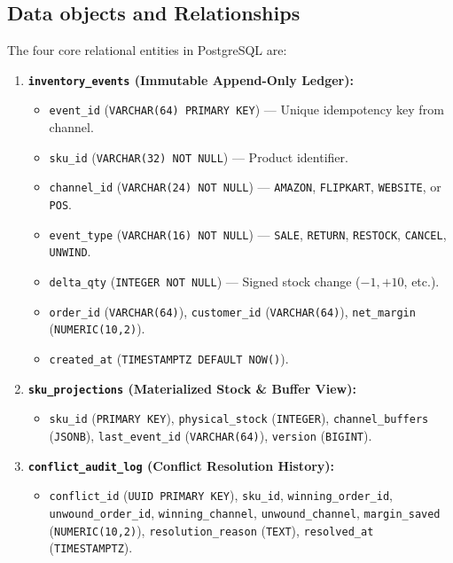 \documentclass[oneside,a4paper,12pt]{report}
\begin{document}
\subsection{Data objects and Relationships}
The four core relational entities in PostgreSQL are:
\begin{enumerate}
  \item \textbf{\texttt{inventory\_events} (Immutable Append-Only Ledger):}
  \begin{itemize}
    \item \texttt{event\_id} (\texttt{VARCHAR(64) PRIMARY KEY}) — Unique idempotency key from channel.
    \item \texttt{sku\_id} (\texttt{VARCHAR(32) NOT NULL}) — Product identifier.
    \item \texttt{channel\_id} (\texttt{VARCHAR(24) NOT NULL}) — \texttt{AMAZON}, \texttt{FLIPKART}, \texttt{WEBSITE}, or \texttt{POS}.
    \item \texttt{event\_type} (\texttt{VARCHAR(16) NOT NULL}) — \texttt{SALE}, \texttt{RETURN}, \texttt{RESTOCK}, \texttt{CANCEL}, \texttt{UNWIND}.
    \item \texttt{delta\_qty} (\texttt{INTEGER NOT NULL}) — Signed stock change ($-1, +10$, etc.).
    \item \texttt{order\_id} (\texttt{VARCHAR(64)}), \texttt{customer\_id} (\texttt{VARCHAR(64)}), \texttt{net\_margin} (\texttt{NUMERIC(10,2)}).
    \item \texttt{created\_at} (\texttt{TIMESTAMPTZ DEFAULT NOW()}).
  \end{itemize}
  \item \textbf{\texttt{sku\_projections} (Materialized Stock \& Buffer View):}
  \begin{itemize}
    \item \texttt{sku\_id} (\texttt{PRIMARY KEY}), \texttt{physical\_stock} (\texttt{INTEGER}), \texttt{channel\_buffers} (\texttt{JSONB}), \texttt{last\_event\_id} (\texttt{VARCHAR(64)}), \texttt{version} (\texttt{BIGINT}).
  \end{itemize}
  \item \textbf{\texttt{conflict\_audit\_log} (Conflict Resolution History):}
  \begin{itemize}
    \item \texttt{conflict\_id} (\texttt{UUID PRIMARY KEY}), \texttt{sku\_id}, \texttt{winning\_order\_id}, \texttt{unwound\_order\_id}, \texttt{winning\_channel}, \texttt{unwound\_channel}, \texttt{margin\_saved} (\texttt{NUMERIC(10,2)}), \texttt{resolution\_reason} (\texttt{TEXT}), \texttt{resolved\_at} (\texttt{TIMESTAMPTZ}).

\end{itemize}
\end{enumerate}
\end{document}
